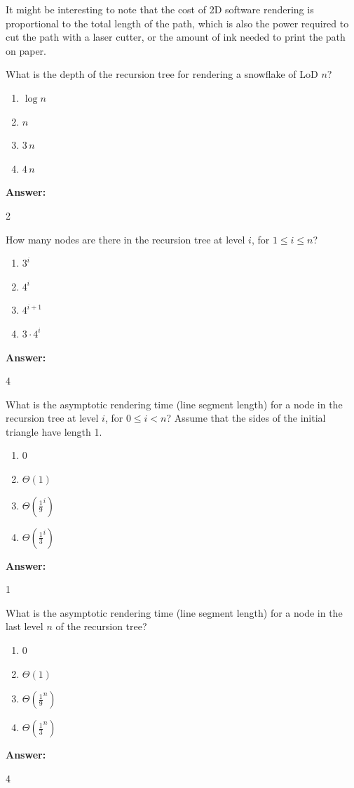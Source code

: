 \documentclass[12pt,twoside]{article}
\newcommand{\answer}{
	\par\medskip
	\textbf{Answer:}
}
\newcommand{\answerIm}{ \answer
	2
}
\newcommand{\answerIn}{ \answer
	4
}
\newcommand{\answerIo}{ \answer
	1
}
\newcommand{\answerIp}{ \answer
	4
}
\begin{document}
\begin{problems}
	It might be interesting to note that the cost of 2D software rendering is
	proportional to the total length of the path, which is also the power required
	to cut the path with a laser cutter, or the amount of ink needed to print the
	path on paper.

	\begin{problemparts}
		\problempart {} What is the depth of the recursion tree for rendering a
		snowflake of LoD $n$?
		\begin{enumerate}
			\item $\log n$
			\item $n$
			\item $3 \, n$
			\item $4 \, n$
		\end{enumerate}
		\answerIm

		\problempart {} How many nodes are there in the recursion tree at level
		$i$, for $1 \le i \le n$?
		\begin{enumerate}
			\item $3 ^ i$
			\item $4 ^ i$
			\item $4 ^ {i + 1}$
			\item $3 \cdot 4 ^ i$
		\end{enumerate}
		\answerIn

		\problempart {} What is the asymptotic rendering time (line segment length)
		for a node in the recursion tree at level $i$, for $0 \le i < n$? Assume that
		the sides of the initial triangle have length 1.
		\begin{enumerate}
			\item $0$
			\item $\Theta(1)$
			\item $\Theta(\frac{1}{9}^i)$
			\item $\Theta(\frac{1}{3}^i)$
		\end{enumerate}
		\answerIo

		\problempart {} What is the asymptotic rendering time (line segment length)
		for a node in the last level $n$ of the recursion tree?
		\begin{enumerate}
			\item $0$
			\item $\Theta(1)$
			\item $\Theta(\frac{1}{9}^n)$
			\item $\Theta(\frac{1}{3}^n)$
		\end{enumerate}
		\answerIp


\end{problemparts}
\end{problems}
\end{document}
